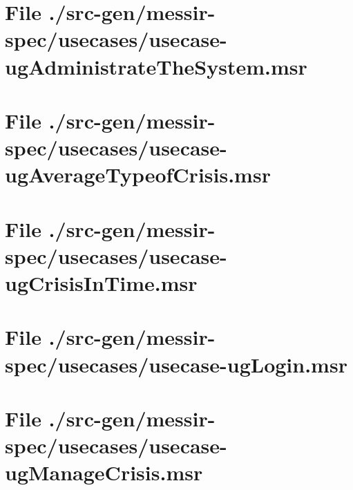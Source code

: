 \section[File /src-gen/messir-spec/usecases/usecase-ugAdministrateTheSystem.msr]{File ./src-gen/messir-spec/usecases/usecase-ugAdministrateTheSystem.msr}
\scriptsize

\normalsize
	
\section[File /src-gen/messir-spec/usecases/usecase-ugAverageTypeofCrisis.msr]{File ./src-gen/messir-spec/usecases/usecase-ugAverageTypeofCrisis.msr}
\scriptsize

\normalsize
	
\section[File /src-gen/messir-spec/usecases/usecase-ugCrisisInTime.msr]{File ./src-gen/messir-spec/usecases/usecase-ugCrisisInTime.msr}
\scriptsize

\normalsize
	
\section[File /src-gen/messir-spec/usecases/usecase-ugLogin.msr]{File ./src-gen/messir-spec/usecases/usecase-ugLogin.msr}
\scriptsize

\normalsize
	
\section[File /src-gen/messir-spec/usecases/usecase-ugManageCrisis.msr]{File ./src-gen/messir-spec/usecases/usecase-ugManageCrisis.msr}
\scriptsize

\normalsize
	
